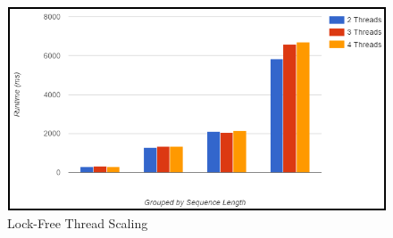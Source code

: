 \documentclass[letterpaper, 10 pt, conference]{IEEEconf}
\begin{document}
\begin{figure}
	\centering
	\includegraphics[scale=0.6]{parallel3-lockfree}
	\caption{Lock-Free Thread Scaling} 
\end{figure}




\end{document}
